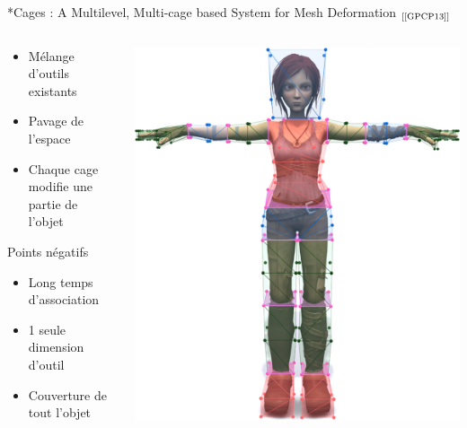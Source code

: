 \documentclass[xcolor=x11names,compress]{beamer}
\renewcommand{\(}{\begin{columns}} \renewcommand{\)}{\end{columns}}
\newcommand{\<}[1]{\begin{column}{#1}} \renewcommand{\>}{\end{column}}
\begin{document}
\begin{frame}{*Cages : A Multilevel, Multi-cage based System for Mesh Deformation 
  $_{[\text{\cite{GPCP13}}]}$}
  \begin{columns}[T]
    \begin{column}{0.5\textwidth}
      \begin{itemize}
        \item Mélange d'outils existants
        \item Pavage de l'espace
        \item Chaque cage modifie une partie de l'objet
      \end{itemize}
      \begin{alertblock}{Points négatifs}
        \begin{itemize}
          \item Long temps d'association
          \item 1 seule dimension d'outil
          \item Couverture de tout l'objet
        \end{itemize}
      \end{alertblock}
    \end{column}
    \begin{column}{0.4\textwidth}
      \centering
      \includegraphics[scale=0.17]{starCages}
    \end{column}
  \end{columns}
\end{frame}
\end{document}
